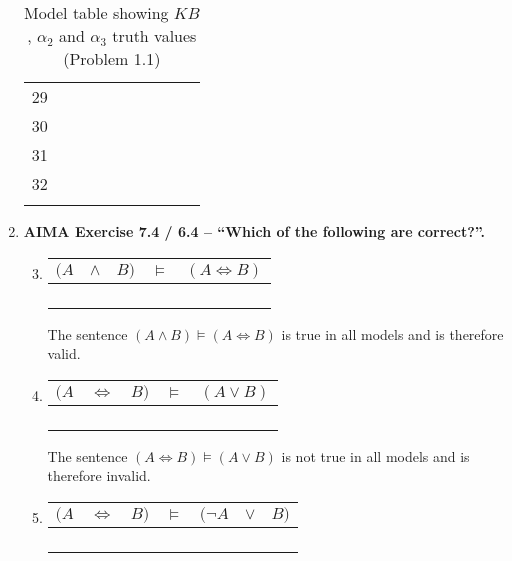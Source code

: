 \begin{enumerate}
\begin{longtable}[c]{c|cccccc|cc|c}
29	  & \T        & \F        & \F        & \T        & \F        & \F        & \T         & \T         & \F   \\
30	  & \T        & \F        & \F        & \T        & \F        & \T        & \T         & \T         & \F   \\
31	  & \T        & \F        & \F        & \T        & \T        & \F        & \F         & \T         & \F   \\
32	  & \T        & \F        & \F        & \T        & \T        & \T        & \F         & \T         & \F   \\
\caption{Model table showing $KB$, $\alpha_2$ and $\alpha_3$ truth values (Problem 1.1)}
\label{table:wompus_truths}
\end{longtable}

\item \textbf{AIMA Exercise 7.4 / 6.4 -- ``Which of the following are correct?''.}

\begin{enumerate}
\setcounter{enumii}{2}

\item 
\begin{tabular}{ccc|c|c}
$(A$ & $\land$ & $B)$ & $\vDash$ & $(A \Leftrightarrow B)$\\
\hline
\F & \F & \F & \T & \T \\
\F & \F & \T & \T & \F \\
\T & \F & \F & \T & \F \\
\T & \T & \T & \T & \T \\
\end{tabular}

The sentence $(A \land B) \vDash (A \Leftrightarrow B)$ is true in all models and is therefore valid.

\item
\begin{tabular}{ccc|c|c}
$(A$ & $\Leftrightarrow$ & $B)$ & $\vDash$ & $(A \lor B)$ \\
\hline
\F & \T & \F & \F & \F \\
\F & \F & \T & \T & \T \\
\T & \F & \F & \T & \T \\
\T & \T & \T & \T & \T \\
\end{tabular}

The sentence $(A \Leftrightarrow B) \vDash (A \lor B)$ is not true in all models and is therefore invalid.

\item
\begin{tabular}{ccc|c|ccc}
$(A$ & $\Leftrightarrow$ & $B)$ & $\vDash$ & $(\neg A$ & $\lor$ & $B)$ \\
\hline
\F & \T & \F & \T & \T & \T & \F \\
\F & \F & \T & \T & \T & \T & \T \\
\T & \F & \F & \T & \F & \F & \F \\
\T & \T & \T & \T & \F & \T & \T \\
\end{tabular}


\end{enumerate}
\end{enumerate}
